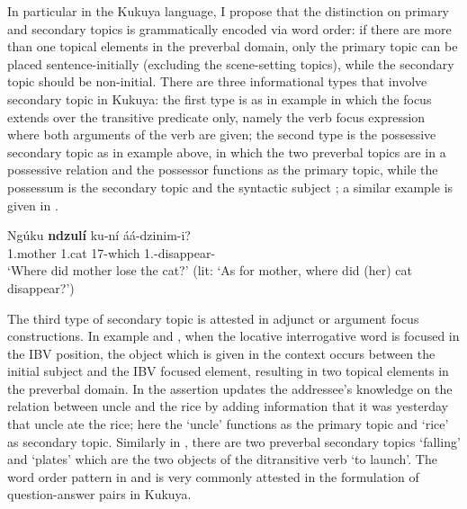 \documentclass[output=paper,colorlinks,citecolor=brown,
]{langscibook}
\begin{document}
In particular in the Kukuya language, I propose that the distinction on primary and secondary topics is grammatically encoded via word order: if there are more than one topical elements in the preverbal domain, only the primary topic can be placed sentence-initially (excluding the scene-setting topics), while the secondary topic should be non-initial. There are three informational types that involve secondary topic in Kukuya: the first type is as in example  in which the focus extends over the transitive predicate only, namely the verb focus expression where both arguments of the verb are given; the second type is the possessive secondary topic as in example  above, in which the two preverbal topics are in a possessive relation and the possessor functions as the primary topic, while the possessum is the secondary topic and the syntactic subject \citep{Nikolaeva2001}; a similar example is given in .
\begin{exe}
\ex
\label{105}
\gll
Ngúku \textbf{ndzulí} ku-ní áá-dzinim-i?\\
1.mother 1.cat 17-which 1\Sm{}.\Pst{}-disappear-\Pst{}\\
\trans ‘Where did mother lose the cat?' (lit: `As for mother, where did (her) cat disappear?')

\end{exe}
The third type of secondary topic is attested in adjunct or argument focus constructions. In example  and , when the locative interrogative word is focused in the IBV position, the object which is given in the context occurs between the initial subject and the IBV focused element, resulting in two topical elements in the preverbal domain. In  the assertion updates the addressee's knowledge on the relation between uncle and the rice by adding information that it was yesterday that uncle ate the rice; here the `uncle' functions as the primary topic and `rice' as secondary topic. Similarly in , there are two preverbal secondary topics `falling' and `plates' which are the two objects of the ditransitive verb `to launch'. The word order pattern in  and  is very commonly attested in the formulation of question-answer pairs in Kukuya.
\end{document}
